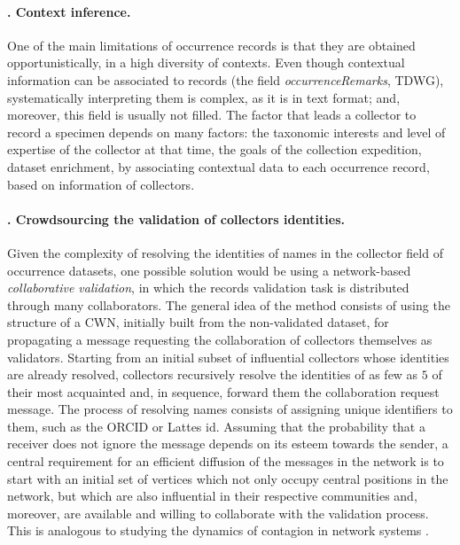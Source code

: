 \paragraph*{\theApplicationCase. Context inference.}
One of the main limitations of occurrence records is that they are obtained opportunistically, in a high diversity of contexts.
Even though contextual information can be associated to records (the field \textit{occurrenceRemarks}, TDWG), systematically interpreting them is complex, as it is in text format; and, moreover, this field is usually not filled.
%
The factor that leads a collector to record a specimen depends on many factors: 
the taxonomic interests and level of expertise of the collector at that time, 
the goals of the collection expedition, 
%
dataset enrichment, by associating contextual data to each occurrence record, based on information of collectors.


\paragraph*{\theApplicationCase. Crowdsourcing the validation of collectors identities.}
Given the complexity of resolving the identities of names in the collector field of occurrence datasets, one possible solution would be using a network-based \textit{collaborative validation}, in which the records validation task is distributed through many collaborators.
The general idea of the method consists of using the structure of a CWN, initially built from the non-validated dataset, for propagating a message requesting the collaboration of collectors themselves as validators.
Starting from an initial subset of influential collectors whose identities are already resolved, collectors recursively resolve the identities of as few as $5$ of their most acquainted and, in sequence, forward them the collaboration request message. %
The process of resolving names consists of assigning unique identifiers to them, such as the ORCID or Lattes id.
Assuming that the probability that a receiver does not ignore the message depends on its esteem towards the sender, a central requirement for an efficient diffusion of the messages in the network is to start with an initial set of vertices which not only occupy central positions in the network, but which are also influential in their respective communities and, moreover, are available and willing to collaborate with the validation process.
This is analogous to studying the dynamics of contagion in network systems \cite{Gibson2005}.




